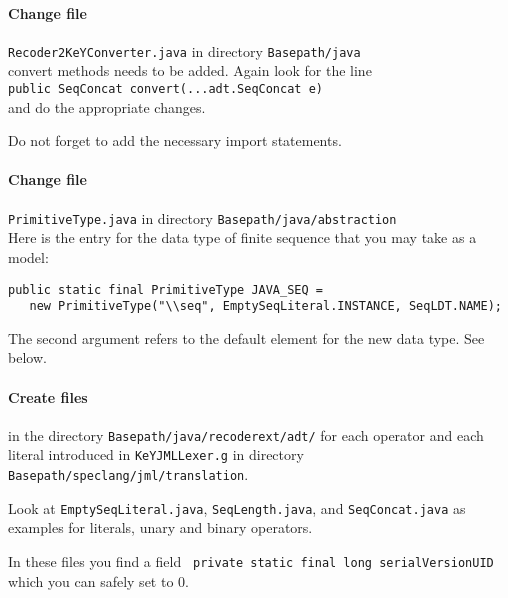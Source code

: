 \documentclass[11pt]{article}
\begin{document}
\paragraph{Change file} \verb+Recoder2KeYConverter.java+ in directory
\verb+Basepath/java+
\\[5pt]
convert methods needs to be added. Again look for the line\\[5pt]
\verb+public SeqConcat convert(...adt.SeqConcat e)+\\[5pt]
and do the appropriate changes.

Do not forget to add the necessary import statements.

\paragraph{Change file}  \verb+PrimitiveType.java+ in directory
\verb+Basepath/java/abstraction+\\[5pt]
Here is the entry for the data type of finite sequence that you may take as a model:
\begin{verbatim}
public static final PrimitiveType JAVA_SEQ =
   new PrimitiveType("\\seq", EmptySeqLiteral.INSTANCE, SeqLDT.NAME);
\end{verbatim}
The second argument refers to  the default element for the new data type. See below. 
\paragraph{Create files} in the directory \verb+Basepath/java/recoderext/adt/+
for each operator and each literal introduced in 
 \verb+KeYJMLLexer.g+ in directory\\ 
\verb+Basepath/speclang/jml/translation+.

Look at \verb+EmptySeqLiteral.java+, \verb+SeqLength.java+, and
\verb+SeqConcat.java+ as examples for literals, unary and binary operators.

In these files you find a field
\verb+ private static final long serialVersionUID+
which you can safely set to $0$.


%
%
\end{document}
